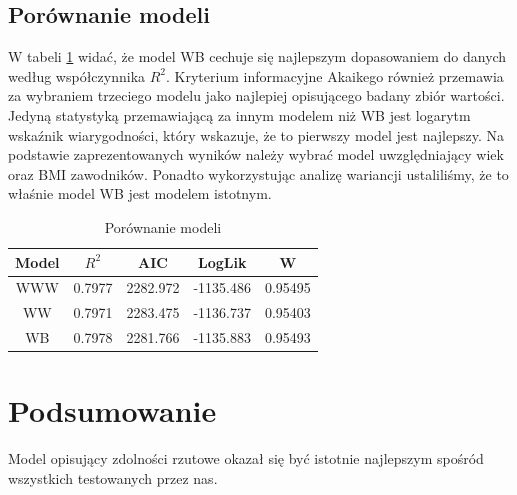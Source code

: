 \documentclass[11pt,a4paper]{article}
\begin{document}
\subsection{Porównanie modeli}
W tabeli \ref{porownanie_modeli_w} widać, że model WB cechuje się najlepszym dopasowaniem do danych według współczynnika $R^2$. Kryterium informacyjne Akaikego również przemawia za wybraniem trzeciego modelu jako najlepiej opisującego badany zbiór wartości. Jedyną statystyką przemawiającą za innym modelem niż WB jest logarytm wskaźnik wiarygodności, który wskazuje, że to pierwszy model jest najlepszy. Na podstawie zaprezentowanych wyników należy wybrać model uwzględniający wiek oraz BMI zawodników. Ponadto wykorzystując analizę wariancji ustaliliśmy, że to właśnie model WB jest modelem istotnym.
\begin{table}
	\begin{center}
		\begin{tabular}{| c | c | c | c | c |}
			\hline
			Model & $R^2$ & AIC & LogLik & W\\ \hline
			WWW & 0.7977 & 2282.972 & -1135.486 & 0.95495\\ \hline
			WW & 0.7971 & 2283.475 & -1136.737 & 0.95403\\ \hline 
			WB & 0.7978 & 2281.766 & -1135.883 & 0.95493\\ \hline  
		\end{tabular}
		\caption{Porównanie modeli}
		\label{porownanie_modeli_w}
	\end{center}
\end{table}

\section{Podsumowanie}
Model opisujący zdolności rzutowe okazał się być istotnie najlepszym spośród wszystkich testowanych przez nas.  
\end{document}
